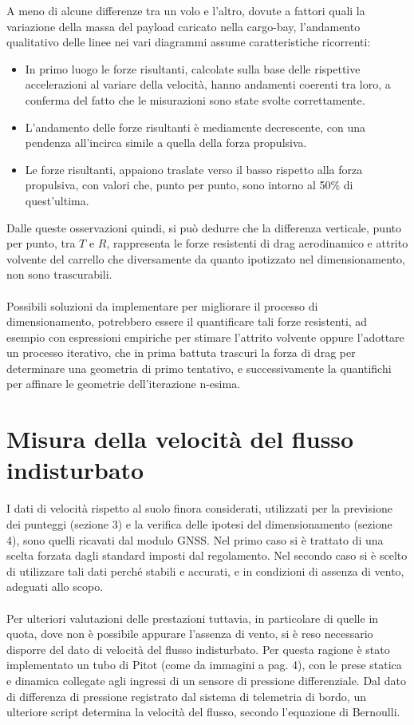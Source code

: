 \documentclass[12pt]{article}
\begin{document}
\noindent
A meno di alcune differenze tra un volo e l'altro, dovute a fattori quali la variazione della massa del payload caricato nella cargo-bay, l'andamento qualitativo delle linee nei vari diagrammi assume caratteristiche ricorrenti:
\begin{itemize}
\item In primo luogo le forze risultanti, calcolate sulla base delle rispettive accelerazioni al variare della velocità, hanno andamenti coerenti tra loro, a conferma del fatto che le misurazioni sono state svolte correttamente.
\item L'andamento delle forze risultanti è mediamente decrescente, con una pendenza all'incirca simile a quella della forza propulsiva.
\item Le forze risultanti, appaiono traslate verso il basso rispetto alla forza propulsiva, con valori che, punto per punto, sono intorno al 50\% di quest'ultima.
\end{itemize}
Dalle queste osservazioni quindi, si può dedurre che la differenza verticale, punto per punto, tra $T$ e $R$, rappresenta le forze resistenti di drag aerodinamico e attrito volvente del carrello che diversamente da quanto ipotizzato nel dimensionamento, non sono trascurabili.
\\\\
Possibili soluzioni da implementare per migliorare il processo di dimensionamento, potrebbero essere il quantificare tali forze resistenti, ad esempio con espressioni empiriche per stimare l'attrito volvente oppure l'adottare un processo iterativo, che in prima battuta trascuri la forza di drag per determinare una geometria di primo tentativo, e successivamente la quantifichi per affinare le geometrie dell'iterazione n-esima.

\section{Misura della velocità del flusso indisturbato}
I dati di velocità rispetto al suolo finora considerati, utilizzati per la previsione dei punteggi (sezione 3) e la verifica delle ipotesi del dimensionamento (sezione 4), sono quelli ricavati dal modulo GNSS. Nel primo caso si è trattato di una scelta forzata dagli standard imposti dal regolamento. Nel secondo caso si è scelto di utilizzare tali dati perché stabili e accurati, e in condizioni di assenza di vento, adeguati allo scopo.
\\\\
Per ulteriori valutazioni delle prestazioni tuttavia, in particolare di quelle in quota, dove non è possibile appurare l'assenza di vento, si è reso necessario disporre del dato di velocità del flusso indisturbato. Per questa ragione è stato implementato un tubo di Pitot (come da immagini a pag. 4), con le prese statica e dinamica collegate agli ingressi di un sensore di pressione differenziale. Dal dato di differenza di pressione registrato dal sistema di telemetria di bordo, un ulteriore script determina la velocità del flusso, secondo l'equazione di Bernoulli.
\end{document}
